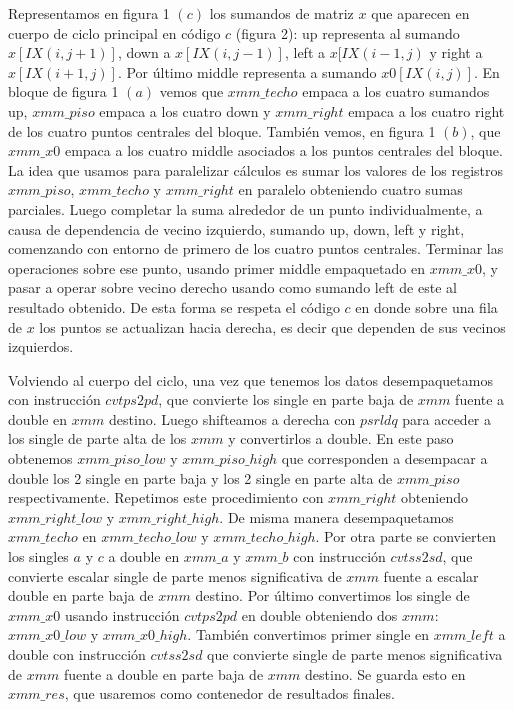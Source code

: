\par Representamos en figura 1 $(c)$ los sumandos de matriz $x$ que aparecen en cuerpo de ciclo principal 
 en código $c$ (figura 2):
 up representa al sumando $x[IX(i,j+1)]$, down a $x[IX(i,j-1)]$, left a $x[IX(i-1,j)$ y right a 
 $x[IX(i+1,j)]$. Por último middle representa a sumando $x0[IX(i,j)]$. En bloque de figura 1 $(a)$ vemos que $xmm\_techo$ empaca a los cuatro sumandos up, $xmm\_piso$
empaca a los cuatro down y $xmm\_right$ empaca a los cuatro right de los cuatro puntos centrales del bloque. También vemos, en figura 1 $(b)$, que $xmm\_x0$ empaca a los cuatro middle asociados a los puntos centrales del bloque.
La idea que usamos para paralelizar cálculos es sumar los valores de los registros $xmm\_piso$,
$xmm\_techo$ y $xmm\_right$ en paralelo obteniendo cuatro sumas parciales.
Luego completar la suma alrededor de un punto individualmente, a causa de dependencia de vecino izquierdo, sumando up, down, left y right, comenzando con entorno de primero de los cuatro puntos centrales. Terminar las operaciones sobre ese punto, usando primer middle empaquetado en $xmm\_x0$, y pasar a operar sobre vecino derecho usando como sumando left de este al resultado obtenido.
De esta forma se respeta el código $c$ en donde sobre una fila de $x$ los 
puntos se actualizan hacia derecha, es decir que dependen de sus vecinos izquierdos.\newline
  
\par Volviendo al cuerpo del ciclo, una vez que tenemos los datos desempaquetamos con instrucción $cvtps2pd$, que convierte los single en parte baja de $xmm$ fuente a double en $xmm$ destino. Luego shifteamos a derecha con $psrldq$ para acceder a los single de parte alta de los $xmm$ y convertirlos a double. En este paso obtenemos $xmm\_piso\_low$ y $xmm\_piso\_high$ que corresponden a desempacar a double los 2 single en parte baja y los 2 single en parte alta de $xmm\_piso$ respectivamente.
Repetimos este procedimiento con $xmm\_right$ obteniendo $xmm\_right\_low$ y $xmm\_right\_high$. De misma manera desempaquetamos $xmm\_techo$ en $xmm\_techo\_low$ y $xmm\_techo\_high$.
Por otra parte se convierten los singles $a$ y $c$ a double en $xmm\_a$ y $xmm\_b$ con instrucción
$cvtss2sd$, que convierte escalar single de parte menos significativa de $xmm$ fuente a
escalar double en parte baja de $xmm$ destino. 
Por último convertimos los single de $xmm\_x0$ usando instrucción $cvtps2pd$ en double obteniendo dos
$xmm$: $xmm\_x0\_low$ y $xmm\_x0\_high$. También convertimos primer single en $xmm\_left$ a double con instrucción $cvtss2sd$ que convierte single de parte menos significativa de $xmm$ fuente a double en parte baja de $xmm$ destino. Se guarda esto en $xmm\_res$, que usaremos como contenedor de resultados finales.\newline

